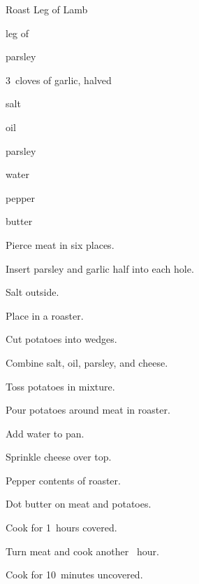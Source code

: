 \begin{recipe}{Roast Leg of Lamb}{}{}

\begin{ingredients}
\item leg of 
\item parsley
\item 3~cloves of garlic, halved
\item salt
\item oil
\item parsley
\item {}
\item \C{\half} water
\item pepper
\item butter
\end{ingredients}

\begin{directions}
\item Pierce meat in six places.
\item Insert parsley and garlic half into each hole.
\item Salt outside.
\item Place in a roaster.
\item Cut potatoes into wedges.
\item Combine salt, oil, parsley, and cheese.
\item Toss potatoes in mixture.
\item Pour potatoes around meat in roaster.
\item Add water to pan.
\item Sprinkle cheese over top.
\item Pepper contents of roaster.
\item Dot butter on meat and potatoes.
\item Cook for 1\half~hours covered.
\item Turn meat and cook another \half~hour.
\item Cook for 10~minutes uncovered.
\end{directions}

\end{recipe}

